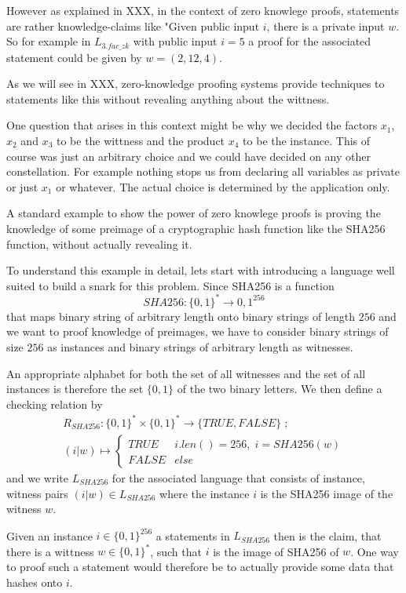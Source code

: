 \begin{example}[3-factorization]
However as explained in XXX, in the context of zero knowlege proofs, statements are rather knowledge-claims like "Given public input $i$, there is a private input $w$. So for example in $L_{3.fac\_zk}$ with public input $i=5$ a proof for the associated statement could be given by $w=(2,12,4)$.

As we will see in XXX, zero-knowledge proofing systems provide techniques to statements like this without revealing anything about the wittness.

One question that arises in this context might be why we decided the factors $x_1$, $x_2$ and $x_3$ to be the wittness and the product $x_4$ to be the instance. This of course was just an arbitrary choice and we could have decided on any other constellation. For example nothing stops us from declaring all variables as private or just $x_1$ or whatever. The actual choice is determined by the application only.
\end{example}
\begin{example} A standard example to show the power of zero knowlege proofs is proving the knowledge of some preimage of a cryptographic hash function like the SHA256 function, without actually revealing it. 

To understand this example in detail, lets start with introducing a language well suited to build a snark for this problem. Since SHA256 is a function
$$
SHA256: \{0,1\}^* \to {0,1}^{256}
$$
that maps binary string of arbitrary length onto binary strings of length $256$ and we want to proof knowledge of preimages, we have to consider binary strings of size $256$ as instances and binary strings of arbitrary length as witnesses. 

An appropriate alphabet for both the set of all witnesses and the set of all instances is therefore the set $\{0,1\}$ of the two binary letters. We then define a checking relation by
\begin{multline*}
R_{SHA256} : \{0,1\}^* \times \{0,1\}^* \to \{TRUE, FALSE\}\;;\;\\
(i|w) \mapsto
\begin{cases}
TRUE & i.len()=256,\; i = SHA256(w)\\
FALSE & else
\end{cases}
\end{multline*}
and we write $L_{SHA256}$ for the associated language that consists of instance, witness pairs $(i|w)\in L_{SHA256}$ where the instance $i$ is the SHA256 image of the witness $w$. 

Given an instance $i\in \{0,1\}^{256}$ a statements in $L_{SHA256}$ then is the claim, that there is a wittness $w\in \{0,1\}^{*}$, such that $i$ is the image of SHA256 of $w$. One way to proof such a statement would therefore be to actually provide some data that hashes onto $i$. 
\end{example}
